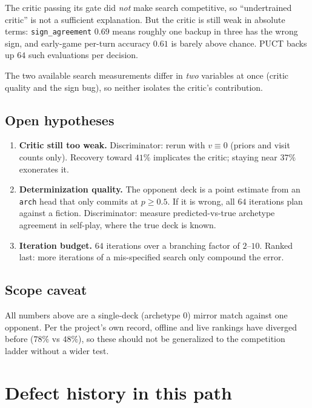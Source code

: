 \documentclass[11pt,a4paper]{article}
\newcommand{\code}[1]{\texttt{\small #1}}
\begin{document}
The critic passing its gate did \emph{not} make search competitive, so
``undertrained critic'' is not a sufficient explanation. But the critic is
still weak in absolute terms: \code{sign\_agreement} $0.69$ means roughly one
backup in three has the wrong sign, and early-game per-turn accuracy $0.61$ is
barely above chance. PUCT backs up $64$ such evaluations per decision.

\noindent
The two available search measurements differ in \emph{two} variables at once
(critic quality and the sign bug), so neither isolates the critic's
contribution.

\subsection{Open hypotheses}

\begin{enumerate}[leftmargin=*]
  \item \textbf{Critic still too weak.} Discriminator: rerun with
    $v \equiv 0$ (priors and visit counts only). Recovery toward $41\%$
    implicates the critic; staying near $37\%$ exonerates it.
  \item \textbf{Determinization quality.} The opponent deck is a point
    estimate from an \code{arch} head that only commits at $p \ge 0.5$. If it
    is wrong, all $64$ iterations plan against a fiction. Discriminator:
    measure predicted-vs-true archetype agreement in self-play, where the true
    deck is known.
  \item \textbf{Iteration budget.} $64$ iterations over a branching factor of
    $2$--$10$. Ranked last: more iterations of a mis-specified search only
    compound the error.
\end{enumerate}

\subsection{Scope caveat}

All numbers above are a single-deck (archetype $0$) mirror match against one
opponent. Per the project's own record, offline and live rankings have
diverged before ($78\%$ vs $48\%$), so these should not be generalized to the
competition ladder without a wider test.

\section{Defect history in this path}
\end{document}
